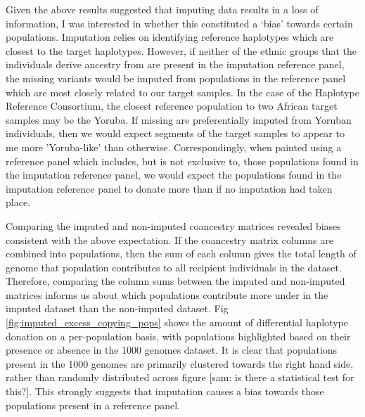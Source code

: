 Given the above results suggested that imputing data results in a loss of information, I was interested in whether this constituted a `bias' towards certain populations. Imputation relies on identifying reference haplotypes which are closest to the target haplotypes. However, if neither of the ethnic groups that the individuals derive ancestry from are present in the imputation reference panel, the missing variants would be imputed from populations in the reference panel which are most closely related to our target samples. In the case of the Haplotype Reference Consortium, the closest reference population to two African target samples may be the Yoruba. If missing are preferentially imputed from Yoruban individuals, then we would expect segments of the target samples to appear to me more 'Yoruba-like' than otherwise. Correspondingly, when painted using a reference panel which includes, but is not exclusive to, those populations found in the imputation reference panel, we would expect the populations found in the imputation reference panel to donate more than if no imputation had taken place.

Comparing the imputed and non-imputed coancestry matrices revealed biases consistent with the above expectation. If the coancestry matrix columns are combined into populations, then the sum of each column gives the total length of genome that population contributes to all recipient individuals in the dataset. Therefore, comparing the column sums between the imputed and non-imputed matrices informs us about which populations contribute more under in the imputed dataset than the non-imputed dataset. Fig \ref{fig:imputed_excess_copying_pops} shows the amount of differential haplotype donation on a per-population basis, with populations highlighted based on their presence or absence in the 1000 genomes dataset. It is clear that populations present in the 1000 genomes are primarily clustered towards the right hand side, rather than randomly distributed across figure [sam: is there a statistical test for this?]. This strongly suggests that imputation causes a bias towards those populations present in a reference panel. 

